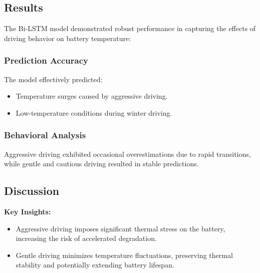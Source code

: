 \subsection{Results}
The \gls{Bi-LSTM} model demonstrated robust performance in capturing the effects of driving behavior on battery temperature:

\subsubsection{Prediction Accuracy}
The model effectively predicted:
\begin{itemize}
    \item Temperature surges caused by aggressive driving.
    \item Low-temperature conditions during winter driving.
\end{itemize}

\subsubsection{Behavioral Analysis}
Aggressive driving exhibited occasional overestimations due to rapid transitions, while gentle and cautious driving resulted in stable predictions.



\subsection{Discussion}
\textbf{Key Insights:}
\begin{itemize}
    \item Aggressive driving imposes significant thermal stress on the battery, increasing the risk of accelerated degradation.
    \item Gentle driving minimizes temperature fluctuations, preserving thermal stability and potentially extending battery lifespan.
\end{itemize}

